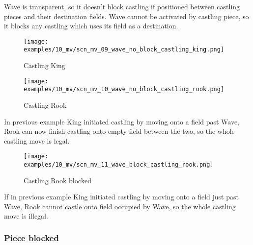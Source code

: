 \vspace*{-0.4\baselineskip}
Wave is transparent, so it doesn't block castling if positioned between castling
pieces and their destination fields. Wave cannot be activated by castling piece,
so it blocks any castling which uses its field as a destination.

\vspace*{-0.4\baselineskip}
\noindent
\begin{figure}[!h]
\texttt{[image: examples/10\_mv/scn\_mv\_09\_wave\_no\_block\_castling\_king.png]}
\vspace*{-1.4\baselineskip}
\caption{Castling King}
\label{fig:scn_mv_09_wave_no_block_castling_king}
\end{figure}

\vspace*{-1.4\baselineskip}
\noindent
\begin{figure}[!h]
\texttt{[image: examples/10\_mv/scn\_mv\_10\_wave\_no\_block\_castling\_rook.png]}
\vspace*{-1.4\baselineskip}
\caption{Castling Rook}
\label{fig:scn_mv_10_wave_no_block_castling_rook}
\end{figure}

\vspace*{-0.4\baselineskip}
In previous example King initiated castling by moving onto a field past Wave, Rook
can now finish castling onto empty field between the two, so the whole castling move
is legal.

\vspace*{-0.4\baselineskip}
\noindent
\begin{figure}[!h]
\texttt{[image: examples/10\_mv/scn\_mv\_11\_wave\_block\_castling\_rook.png]}
\vspace*{-1.4\baselineskip}
\caption{Castling Rook blocked}
\label{fig:scn_mv_11_wave_block_castling_rook}
\end{figure}

\vspace*{-0.4\baselineskip}
If in previous example King initiated castling by moving onto a field just past Wave,
Rook cannot castle onto field occupied by Wave, so the whole castling move is illegal.

\clearpage %

\subsubsection*{Piece blocked}
\label{sec:Miranda's veil/Wave/Activation/Piece blocked}

